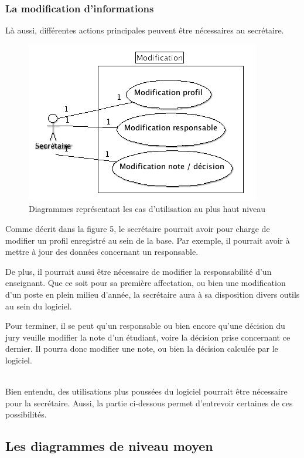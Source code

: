 \documentclass[letter, 11pt] {article}
\begin{document}
	\subsubsection{La modification d'informations}
	
	Là aussi, différentes actions principales peuvent être nécessaires au secrétaire.
	
	\begin{figure}[!h]
		\centering
			\includegraphics[scale = 0.7]{../UseCase/UseCaseHautNiveau/Modification.png}
		\caption{Diagrammes représentant les cas d'utilisation au plus haut niveau}
	\end{figure}
	
	Comme décrit dans la figure 5, le secrétaire pourrait avoir pour charge de modifier un profil enregistré au sein de la base. Par exemple, il pourrait avoir à mettre à jour des données concernant un responsable.
	
	De plus, il pourrait aussi être nécessaire de modifier la responsabilité d'un enseignant. Que ce soit pour sa première affectation, ou bien une modification d'un poste en plein milieu d'année, la secrétaire aura à sa disposition divers outils au sein du logiciel.
	
	Pour terminer, il se peut qu'un responsable ou bien encore qu'une décision du jury veuille modifier la note d'un étudiant, voire la décision prise concernant ce dernier. Il pourra donc modifier une note, ou bien la décision calculée par le logiciel.
	
	
	~\\
	
	Bien entendu, des utilisations plus poussées du logiciel pourrait être nécessaire pour la secrétaire. Aussi, la partie ci-dessous permet d'entrevoir certaines de ces possibilités.
	
	\subsection{Les diagrammes de niveau moyen}
	
\end{document}
